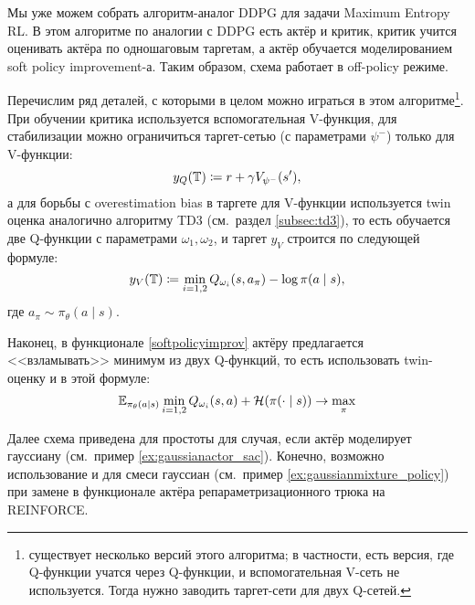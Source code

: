 Мы уже можем собрать алгоритм-аналог DDPG для задачи Maximum Entropy RL. В этом алгоритме по аналогии с DDPG есть актёр и критик, критик учится оценивать актёра по одношаговым таргетам, а актёр обучается моделированием soft policy improvement-а. Таким образом, схема работает в off-policy режиме.

Перечислим ряд деталей, с которыми в целом можно играться в этом алгоритме\footnote{существует несколько версий этого алгоритма; в частности, есть версия, где Q-функции учатся через Q-функции, и вспомогательная V-сеть не используется. Тогда нужно заводить таргет-сети для двух Q-сетей.}. При обучении критика используется вспомогательная V-функция, для стабилизации можно ограничиться таргет-сетью (с параметрами $\psi^{-}$) только для V-функции:
$$y_Q(\mathbb{T}) \coloneqq r + \gamma V_{\psi^{-}}(s'),$$
а для борьбы с overestimation bias в таргете для V-функции используется twin оценка аналогично алгоритму TD3 (см.~раздел \ref{subsec:td3}), то есть обучается две Q-функции с параметрами $\omega_1, \omega_2$, и таргет $y_V$ строится по следующей формуле: 
$$y_V(\mathbb{T}) \coloneqq \min_{i = {1, 2}} Q_{\omega_i}(s, a_\pi) - \log \pi(a \mid s),$$
где $a_\pi \sim \pi_\theta(a \mid s)$.

Наконец, в функционале \eqref{softpolicyimprov} актёру предлагается <<взламывать>> минимум из двух Q-функций, то есть использовать twin-оценку и в этой формуле:
$$\mathbb{E}_{\pi_\theta(a \mid s)} \min_{i=1,2} Q_{\omega_i}(s, a) + \mathcal{H}(\pi(\cdot \mid s)) \to \max_{\pi}$$

Далее схема приведена для простоты для случая, если актёр моделирует гауссиану (см.~пример \ref{ex:gaussianactor_sac}). Конечно, возможно использование и для смеси гауссиан (см.~пример \ref{ex:gaussianmixture_policy}) при замене в функционале актёра репараметризационного трюка на REINFORCE. 

